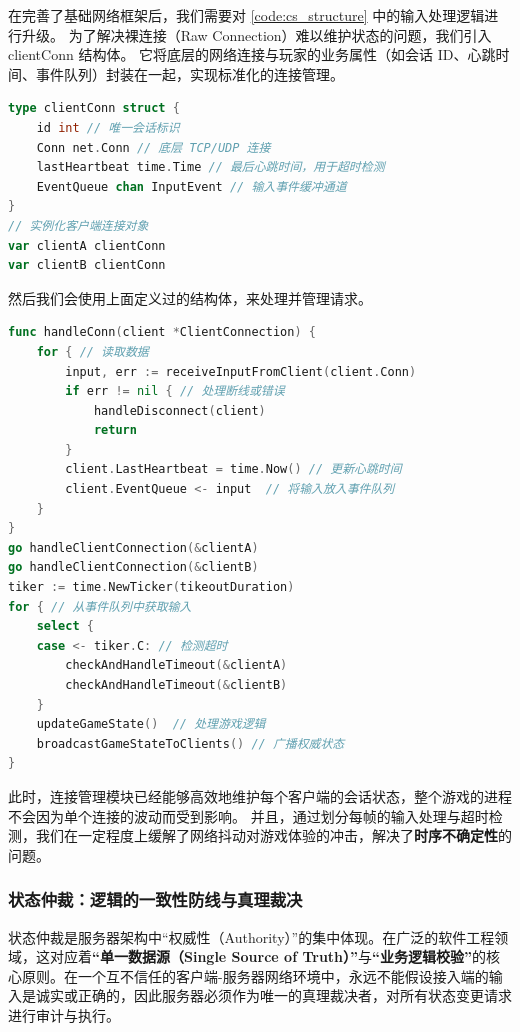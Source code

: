 在完善了基础网络框架后，我们需要对 \ref{code:cs_structure} 中的输入处理逻辑进行升级。
为了解决裸连接（Raw Connection）难以维护状态的问题，我们引入 clientConn 结构体。
它将底层的网络连接与玩家的业务属性（如会话 ID、心跳时间、事件队列）封装在一起，实现标准化的连接管理。

\begin{tcolorbox}[title=连接管理的结构体定义] 
\begin{lstlisting}[style=codeblock, language=go]
type clientConn struct { 
    id int // 唯一会话标识 
    Conn net.Conn // 底层 TCP/UDP 连接 
    lastHeartbeat time.Time // 最后心跳时间，用于超时检测 
    EventQueue chan InputEvent // 输入事件缓冲通道 
}
// 实例化客户端连接对象 
var clientA clientConn 
var clientB clientConn
\end{lstlisting} 
\end{tcolorbox}

然后我们会使用上面定义过的结构体，来处理并管理请求。


\begin{tcolorbox}[title=连接管理伪代码示例]
\begin{lstlisting}[style=codeblock, language=go]
func handleConn(client *ClientConnection) {
    for { // 读取数据
        input, err := receiveInputFromClient(client.Conn)
        if err != nil { // 处理断线或错误
            handleDisconnect(client)
            return
        }
        client.LastHeartbeat = time.Now() // 更新心跳时间
        client.EventQueue <- input  // 将输入放入事件队列
    }
}
go handleClientConnection(&clientA)
go handleClientConnection(&clientB)
tiker := time.NewTicker(tikeoutDuration)
for { // 从事件队列中获取输入
    select {
    case <- tiker.C: // 检测超时
        checkAndHandleTimeout(&clientA)
        checkAndHandleTimeout(&clientB)
    }
    updateGameState()  // 处理游戏逻辑
    broadcastGameStateToClients() // 广播权威状态
}
\end{lstlisting}
\end{tcolorbox}

此时，连接管理模块已经能够高效地维护每个客户端的会话状态，整个游戏的进程不会因为单个连接的波动而受到影响。
并且，通过划分每帧的输入处理与超时检测，我们在一定程度上缓解了网络抖动对游戏体验的冲击，解决了\textbf{时序不确定性}的问题。


\subsubsection{状态仲裁：逻辑的一致性防线与真理裁决}

状态仲裁是服务器架构中“权威性（Authority）”的集中体现。在广泛的软件工程领域，这对应着\textbf{“单一数据源（Single Source of Truth）”}与\textbf{“业务逻辑校验”}的核心原则。在一个互不信任的客户端-服务器网络环境中，永远不能假设接入端的输入是诚实或正确的，因此服务器必须作为唯一的真理裁决者，对所有状态变更请求进行审计与执行。

